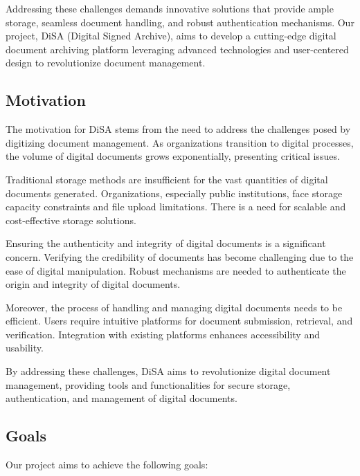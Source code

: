 \documentclass[a4paper,11pt]{article}
\begin{document}
            Addressing these challenges demands innovative solutions that provide ample storage, seamless document handling, and robust authentication mechanisms. Our project, DiSA (Digital Signed Archive), aims to develop a cutting-edge digital document archiving platform leveraging advanced technologies and user-centered design to revolutionize document management.       
            
        \subsection{Motivation}
            \quad The motivation for DiSA stems from the need to address the challenges posed by digitizing document management. As organizations transition to digital processes, the volume of digital documents grows exponentially, presenting critical issues.
    
            Traditional storage methods are insufficient for the vast quantities of digital documents generated. Organizations, especially public institutions, face storage capacity constraints and file upload limitations. There is a need for scalable and cost-effective storage solutions.
            
            Ensuring the authenticity and integrity of digital documents is a significant concern. Verifying the credibility of documents has become challenging due to the ease of digital manipulation. Robust mechanisms are needed to authenticate the origin and integrity of digital documents.

            \pagebreak
            Moreover, the process of handling and managing digital documents needs to be efficient. Users require intuitive platforms for document submission, retrieval, and verification. Integration with existing platforms enhances accessibility and usability.
            
            By addressing these challenges, DiSA aims to revolutionize digital document management, providing tools and functionalities for secure storage, authentication, and management of digital documents.
    
        \subsection{Goals}
            Our project aims to achieve the following goals:
    
\end{document}
